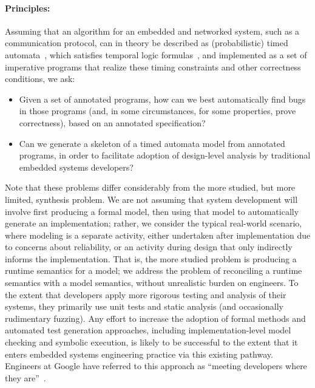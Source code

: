 \paragraph{Principles:} Assuming that an algorithm for an embedded and
networked system, such as a communication protocol, can in theory be
described as (probabilistic) timed automata~\cite{AD1994:TCS}, which
satisfies temporal logic formulas~\cite{BLM2017:LNCS}, and implemented
as a set of imperative programs that realize these timing constraints
and other correctness conditions, we ask:
\begin{itemize}[labelsep=3pt,leftmargin=12pt]
\item Given a set of annotated programs, how can we best automatically
  find bugs in those programs (and, in some circumstances, for some
  properties, prove correctness), based on an annotated
  specification?
\item Can we generate a skeleton of a timed automata model from 
  annotated programs, in order to facilitate adoption of design-level analysis by 
  traditional embedded systems developers? 
\end{itemize}

Note that these problems differ considerably from the more studied,
but more limited, synthesis problem.  We are not assuming that
system development will involve first producing a formal model, then
using that model to automatically generate an implementation; rather,
we consider the typical real-world scenario, where modeling is a
separate activity, either undertaken after implementation due to
concerns about reliability, or an activity during design that only
indirectly informs the implementation.  That is, the more studied
problem is producing a runtime semantics for a model; we address the
problem of reconciling a runtime semantics with a model semantics,
without unrealistic burden on engineers.  To the extent that developers apply more rigorous
testing and analysis of their systems, they primarily use unit tests
and static analysis (and occasionally rudimentary  fuzzing).  Any
effort to increase the
adoption of formal methods and automated test generation
approaches, including implementation-level model checking and symbolic
execution, is likely to be successful to the extent that it enters
embedded systems engineering practice via this existing pathway.  Engineers at Google have referred to this
approach as ``meeting developers where they are''~\cite{meeting}.


